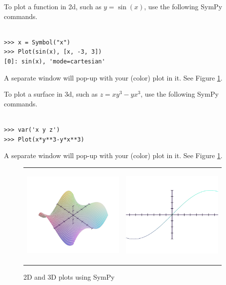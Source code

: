 \documentclass[12pt]{article}
\begin{document}
To plot a function in 2d, such as $y=\sin(x)$,
use the following SymPy commands.

\begin{Verbatim}[fontsize=\scriptsize,fontfamily=courier,fontshape=tt,frame=single,label=SymPy]

>>> x = Symbol("x")
>>> Plot(sin(x), [x, -3, 3])
[0]: sin(x), 'mode=cartesian'

\end{Verbatim}

\noindent
A separate window will pop-up with your (color) plot in it.
See Figure \ref{fig:sympy-plots}.

To plot a surface in 3d, such as $z=xy^3-yx^3$,
use the following SymPy commands.

\begin{Verbatim}[fontsize=\scriptsize,fontfamily=courier,fontshape=tt,frame=single,label=SymPy]

>>> var('x y z')
>>> Plot(x*y**3-y*x**3)

\end{Verbatim}

\noindent
A separate window will pop-up with your (color) plot in it.
See Figure \ref{fig:sympy-plots}.


\begin{figure}[h!]
\begin{minipage}{\textwidth}
\begin{center}
\begin{tabular}{cc}
\includegraphics[height=5cm,width=5cm]{oscas-sympy-plot1b}
 &\includegraphics[height=5cm,width=5cm]{oscas-sympy-plot2b} \\
\end{tabular}
\end{center}
\end{minipage}
\caption{2D and 3D plots using SymPy}
\label{fig:sympy-plots}
\end{figure}
\end{document}
